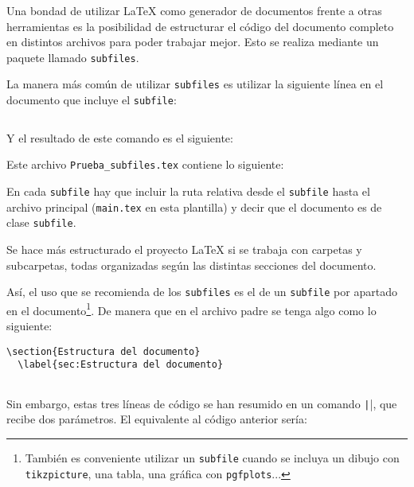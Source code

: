 \documentclass[../../main.tex]{subfile}
\begin{document}
  Una bondad de utilizar LaTeX como generador de documentos frente a otras herramientas es la posibilidad de estructurar el código del documento completo en distintos archivos para poder trabajar mejor. Esto se realiza mediante un paquete llamado \texttt{subfiles}.

  La manera más común de utilizar \texttt{subfiles} es utilizar la siguiente línea en el documento que incluye el \texttt{subfile}:

  \begin{verbatim}

  \end{verbatim}

  Y el resultado de este comando es el siguiente:

  

  Este archivo \texttt{Prueba\_subfiles.tex} contiene lo siguiente:


  En cada \texttt{subfile} hay que incluir la ruta relativa desde el \texttt{subfile} hasta el archivo principal (\texttt{main.tex} en esta plantilla) y decir que el documento es de clase \texttt{subfile}.

  Se hace más estructurado el proyecto LaTeX si se trabaja con carpetas y subcarpetas, todas organizadas según las distintas secciones del documento.

  Así, el uso que se recomienda de los \texttt{subfiles} es el de un \texttt{subfile} por apartado en el documento\footnote{También es conveniente utilizar un \texttt{subfile} cuando se incluya un dibujo con \texttt{tikzpicture}, una tabla, una gráfica con \texttt{pgfplots}...}. De manera que en el archivo padre se tenga algo como lo siguiente:

  \begin{verbatim}
\section{Estructura del documento}
  \label{sec:Estructura del documento}
  
  \end{verbatim}

  Sin embargo, estas tres líneas de código se han resumido en un comando \texttt|\mysection|, que recibe dos parámetros. El equivalente al código anterior sería:
\end{document}
